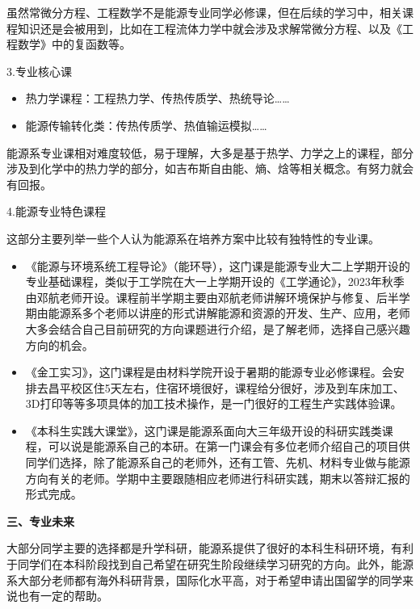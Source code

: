 \documentclass[11pt,oneside]{book}
\begin{document}
虽然常微分方程、工程数学不是能源专业同学必修课，但在后续的学习中，相关课程知识还是会被用到，比如在工程流体力学中就会涉及求解常微分方程、以及《工程数学》中的复函数等。

3.专业核心课
\begin{itemize}
    \item 热力学课程：工程热力学、传热传质学、热统导论……

    \item 能源传输转化类：传热传质学、热值输运模拟……

\end{itemize}


能源系专业课相对难度较低，易于理解，大多是基于热学、力学之上的课程，部分涉及到化学中的热力学的部分，如吉布斯自由能、熵、焓等相关概念。有努力就会有回报。

4.能源专业特色课程

这部分主要列举一些个人认为能源系在培养方案中比较有独特性的专业课。

\begin{itemize}
    \item 《能源与环境系统工程导论》（能环导），这门课是能源专业大二上学期开设的专业基础课程，类似于工学院在大一上学期开设的《工学通论》，2023年秋季由邓航老师开设。课程前半学期主要由邓航老师讲解环境保护与修复、后半学期由能源系多个老师以讲座的形式讲解能源和资源的开发、生产、应用，老师大多会结合自己目前研究的方向课题进行介绍，是了解老师，选择自己感兴趣方向的机会。

    \item 《金工实习》，这门课程是由材料学院开设于暑期的能源专业必修课程。会安排去昌平校区住5天左右，住宿环境很好，课程给分很好，涉及到车床加工、3D打印等等多项具体的加工技术操作，是一门很好的工程生产实践体验课。

    \item 《本科生实践大课堂》，这门课是能源系面向大三年级开设的科研实践类课程，可以说是能源系自己的本研。在第一门课会有多位老师介绍自己的项目供同学们选择，除了能源系自己的老师外，还有工管、先机、材料专业做与能源方向有关的老师。学期中主要跟随相应老师进行科研实践，期末以答辩汇报的形式完成。

\end{itemize}



\textbf{三、专业未来}

大部分同学主要的选择都是升学科研，能源系提供了很好的本科生科研环境，有利于同学们在本科阶段找到自己希望在研究生阶段继续学习研究的方向。此外，能源系大部分老师都有海外科研背景，国际化水平高，对于希望申请出国留学的同学来说也有一定的帮助。
\end{document}
